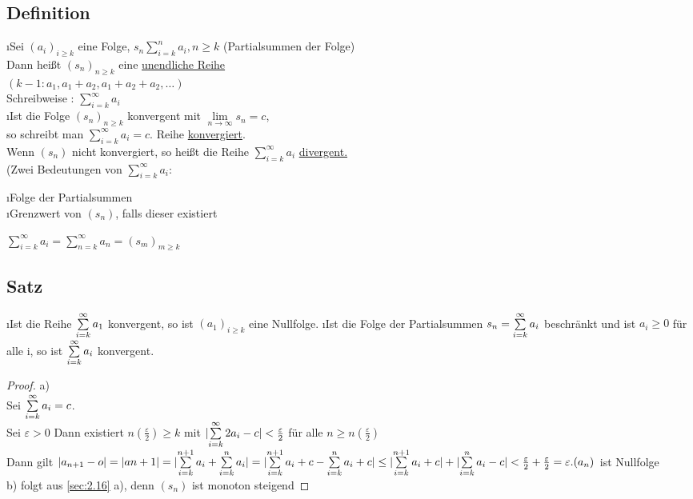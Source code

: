 \subsection{Definition}
\begin{enumerate}[a)]
\i Sei $(a_i)_{i \geq k}$ eine Folge, $s_n \sum\limits_{i = k}^{n} a_i , n \geq k$ (Partialsummen der Folge)\\
Dann hei\ss t $(s_n)_{n \geq k}$ eine \underline{unendliche Reihe}\\
$(k-1: a_1, a_1+a_2, a_1 + a_2 + a_2,\ldots)$\\
Schreibweise : $\sum\limits_{i = k}^{\infty} a_i$\\
\i Ist die Folge $(s_n)_{n \geq k}$ konvergent mit $\lim\limits_{n \rightarrow \infty} s_n = c$,\\
so schreibt man $\sum\limits_{i = k}^{\infty} a_i =c.$ Reihe \underline{konvergiert}.\\
Wenn $(s_n)$ nicht konvergiert, so hei\ss t die Reihe $\sum\limits_{i =k}^{\infty} a_i$ \underline{divergent.}\\
(Zwei Bedeutungen von $\sum\limits_{i = k}^{\infty} a_i:$\\
\begin{enumerate}[-]
\i Folge der Partialsummen\\
\i Grenzwert von $(s_n)$, falls dieser existiert
\end{enumerate}
$\sum\limits_{i=k}^{\infty} a_i = \sum\limits_{n=k}^{\infty} a_n = (s_m)_{m \geq k}$
\end{enumerate}
\subsection[Satz: Reihenkonvergenz]{Satz}
\begin{enumerate}[a)]
\i Ist die Reihe $\sum\limits_{i=k}^{\infty} a_1$ konvergent, so ist $(a_1)_{i \geq k}$ eine Nullfolge.
\i Ist die Folge der Partialsummen $s_n = \sum\limits_{i=k}^{\infty} a_i$ beschränkt und ist $a_i \geq 0$ für alle i, so ist $\sum\limits_{i=k}^{\infty} a_i$ konvergent.
\begin{proof}
a)\\
Sei $\sum\limits_{i=k}^{\infty} a_i = c$.\\
Sei $\varepsilon > 0$ Dann existiert $n(\frac{\varepsilon}{2}) \geq k$ mit $\lvert \sum\limits_{i=k}^{\infty} 2{a_i - c} \rvert < \frac{\varepsilon	}{2}$ für alle $ n \geq n(\frac{\varepsilon}{2})$\\
Dann gilt $\lvert a_{n+1} -o \rvert = \lvert a{n+1} \rvert = \lvert \sum\limits_{i=k}^{n+1} a_i + \sum\limits_{i=k}^{n} a_i \rvert = \\
\lvert \sum\limits_{i=k}^{n+1} a_i+c-\sum\limits_{i=k}^{n} a_i +c \rvert \leq \lvert \sum\limits_{i=k}^{n+1} a_i+c \rvert+\lvert \sum\limits_{i=k}^{n} a_i -c \rvert <  \frac{\varepsilon}{2} + \frac{\varepsilon}{2} = \varepsilon.\\
(a_n)$ ist Nullfolge\\
b) folgt aus \ref{sec:2.16} a), denn $(s_n)$ ist monoton steigend
\end{proof}
\end{enumerate}
